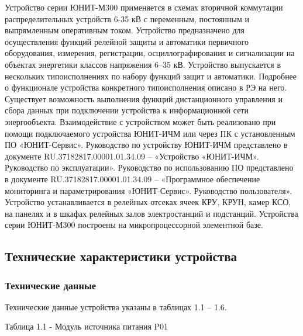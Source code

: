 \color{black}

\color{black}

\par
\sloppy

Устройство серии ЮНИТ-М300 применяется в схемах вторичной коммутации распределительных устройств 6-35 кВ с переменным, постоянным и выпрямленным оперативным током. Устройство предназначено для осуществления функций релейной защиты и автоматики первичного оборудования, измерения, регистрации, осциллографирования и сигнализации на объектах энергетики классов напряжения 6–35 кВ. Устройство выпускается в нескольких типоисполнениях по набору функций защит и автоматики. Подробнее о функционале устройства конкретного типоисполнения описано в РЭ на него. 
Существует возможность выполнения функций дистанционного управления и сбора данных при подключении устройства к информационной сети энергообъекта.
Взаимодействие с устройством может быть реализовано при помощи подключаемого устройства ЮНИТ-ИЧМ или через ПК с установленным ПО «ЮНИТ-Сервис». Руководство по устройству ЮНИТ-ИЧМ представлено в документе RU.37182817.00001.01.34.09 – «Устройство «ЮНИТ-ИЧМ». Руководство по эксплуатации». Руководство по использованию ПО представлено в документе RU.37182817.00001.01.34.09 – «Программное обеспечение мониторинга и параметрирования «ЮНИТ-Сервис». Руководство пользователя». 
Устройство устанавливается в релейных отсеках ячеек КРУ, КРУН, камер КСО, на панелях и в шкафах релейных залов электростанций и подстанций.
Устройства серии ЮНИТ-М300 построены на микропроцессорной элементной базе.

\subsection{Технические характеристики устройства}
\subsubsection{Технические данные}
Технические данные устройства указаны в таблицах 1.1 – 1.6.

Таблица 1.1 - Модуль источника питания P01